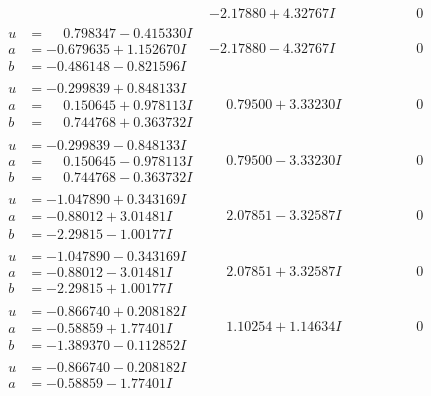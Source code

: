 \documentclass[1p]{elsarticle_modified}
\theoremstyle{definition}
\begin{document}
$$\begin{array}{c|c|c}
 & -2.17880 + 4.32767 I & \phantom{-0.000000 } 0 \\ \hline\begin{aligned}
u &= \phantom{-}0.798347 - 0.415330 I \\
a &= -0.679635 + 1.152670 I \\
b &= -0.486148 - 0.821596 I\end{aligned}
 & -2.17880 - 4.32767 I & \phantom{-0.000000 } 0 \\ \hline\begin{aligned}
u &= -0.299839 + 0.848133 I \\
a &= \phantom{-}0.150645 + 0.978113 I \\
b &= \phantom{-}0.744768 + 0.363732 I\end{aligned}
 & \phantom{-}0.79500 + 3.33230 I & \phantom{-0.000000 } 0 \\ \hline\begin{aligned}
u &= -0.299839 - 0.848133 I \\
a &= \phantom{-}0.150645 - 0.978113 I \\
b &= \phantom{-}0.744768 - 0.363732 I\end{aligned}
 & \phantom{-}0.79500 - 3.33230 I & \phantom{-0.000000 } 0 \\ \hline\begin{aligned}
u &= -1.047890 + 0.343169 I \\
a &= -0.88012 + 3.01481 I \\
b &= -2.29815 - 1.00177 I\end{aligned}
 & \phantom{-}2.07851 - 3.32587 I & \phantom{-0.000000 } 0 \\ \hline\begin{aligned}
u &= -1.047890 - 0.343169 I \\
a &= -0.88012 - 3.01481 I \\
b &= -2.29815 + 1.00177 I\end{aligned}
 & \phantom{-}2.07851 + 3.32587 I & \phantom{-0.000000 } 0 \\ \hline\begin{aligned}
u &= -0.866740 + 0.208182 I \\
a &= -0.58859 + 1.77401 I \\
b &= -1.389370 - 0.112852 I\end{aligned}
 & \phantom{-}1.10254 + 1.14634 I & \phantom{-0.000000 } 0 \\ \hline\begin{aligned}
u &= -0.866740 - 0.208182 I \\
a &= -0.58859 - 1.77401 I \\

\end{aligned}
\end{array}$$
\end{document}
